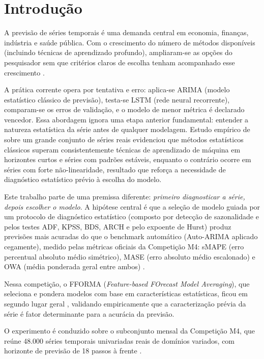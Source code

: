 \documentclass[12pt, a4paper]{article}
\begin{document}
\section{Introdução}

A previsão de séries temporais é uma demanda central em economia, finanças,
indústria e saúde pública. Com o crescimento do número de métodos disponíveis
(incluindo técnicas de aprendizado profundo), ampliaram-se as opções do
pesquisador sem que critérios claros de escolha tenham acompanhado esse
crescimento \cite{makridakis2020m4}.

A prática corrente opera por tentativa e erro: aplica-se ARIMA (modelo
estatístico clássico de previsão), testa-se LSTM (rede neural recorrente),
\mbox{comparam-se} os erros de validação, e o modelo de menor métrica é
declarado vencedor. Essa abordagem ignora uma etapa anterior fundamental: entender a
natureza estatística da série antes de qualquer modelagem. Estudo empírico de
 sobre um grande conjunto de séries reais
evidenciou que métodos estatísticos clássicos superam consistentemente técnicas
de aprendizado de máquina em horizontes curtos e séries com padrões estáveis,
enquanto o contrário ocorre em séries com forte não-linearidade, resultado que
reforça a necessidade de diagnóstico estatístico prévio à escolha do modelo.

Este trabalho parte de uma premissa diferente: \textit{primeiro diagnosticar a
série, depois escolher o modelo}. A hipótese central é que a seleção de modelo
guiada por um protocolo de diagnóstico estatístico (composto por detecção de
sazonalidade e pelos testes ADF, KPSS, BDS, ARCH e pelo expoente de Hurst)
produz previsões mais acuradas do que o benchmark automático (Auto-ARIMA
aplicado cegamente), medido pelas métricas oficiais da Competição M4: sMAPE (erro percentual
absoluto médio simétrico), MASE (erro absoluto médio escalonado) e OWA
(média ponderada geral entre ambos) \cite{makridakis2018m4results}.

Nessa competição, o FFORMA (\textit{Feature-based FOrecast Model Averaging}),
que seleciona e pondera modelos com base em
características estatísticas, ficou em segundo lugar geral
\cite{montero2020fforma}, validando empiricamente que a caracterização prévia
da série é fator determinante para a acurácia da previsão.

O experimento é conduzido sobre o subconjunto mensal da Competição M4, que
reúne 48.000 séries temporais univariadas reais de domínios variados, com
horizonte de previsão de 18 passos à frente \cite{makridakis2020m4}.
\end{document}
